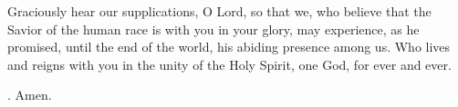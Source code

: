 \lettrine[lines=3]{G}{}raciously hear our supplications, O Lord,
so that we, who believe that the Savior of the human race
is with you in your glory,
may experience, as he promised,
until the end of the world,
his abiding presence among us.
Who lives and reigns with you in the unity of the Holy Spirit,
one God, for ever and ever.
\par \Rbar. Amen.
